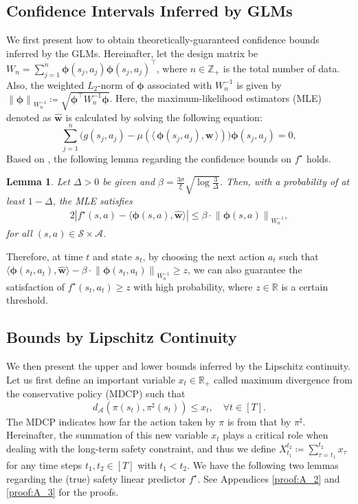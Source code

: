 \documentclass[letterpaper]{article} %
\newtheorem{lemma}
{Lemma}
\newcommand{\la}{\langle\,}
\newcommand{\ra}{\,\rangle}
\newcommand{\R}{\mathbb{R}}
\newcommand{\cA}{\mathcal{A}}
\newcommand{\cS}{\mathcal{S}}
\newcommand{\bphi}{\bm{\phi}}
\newcommand{\iprod}[2]{\langle #1, #2 \rangle}
\newcommand{\abs}[1]{\left|{#1}\right|}
\newcommand{\onlynorm}[1]{\left\|{#1}\right\|}
\begin{document}
\subsection{Confidence Intervals Inferred by GLMs}
\label{sec:bound_glm}

We first present how to obtain theoretically-guaranteed confidence bounds inferred by the GLMs.
Hereinafter, let the design matrix be
%
$W_n = \sum_{j=1}^n \bm{\phi}(s_j, a_j) \bm{\phi}(s_j, a_j)^\top$, where $n \in \mathbb{Z}_+$ is the total number of data.
%
Also, the weighted $L_2$-norm of $\bm{\phi}$ associated with $W_n^{-1}$ is given by
$\onlynorm{\bm{\phi}}_{W_n^{-1}} \coloneqq \sqrt{\bm{\phi}^\top W_n^{-1} \bm{\phi}}$.
%
Here, the maximum-likelihood estimators (MLE) denoted as $\hat{\bm{w}}$ is calculated by solving the following equation:
%
\begin{equation*}
    \sum_{j=1}^n \bigl(g(s_j, a_j) - \mu(\la \bphi(s_j, a_j), \bm{w} \ra) \bigr) \bphi(s_j, a_j) = 0,
\end{equation*}
%
Based on \citet{li2017provably}, the following lemma regarding the confidence bounds on $f^\star$ holds.
%
\begin{lemma}
\label{lemma:confidence_bound}
Let $\Delta > 0$ be given and $\beta = \frac{3 \sigma}{\xi} \sqrt{\log \frac{3}{\Delta}}$.
%
Then, with a probability of at least $1-\Delta$, the MLE satisfies
%
\begin{alignat*}{2}
\abs{f^\star(s,a) - \iprod{\bphi(s,a)}{\hat{\bm{w}}}} \le \beta \cdot \onlynorm{\bphi(s,a)}_{W_n^{-1}},
\end{alignat*}
%
for all $(s,a) \in \cS \times \cA$.
\end{lemma}
%
\noindent
Therefore, at time $t$ and state $s_t$, by choosing the next action $a_t$ such that $\iprod{\bphi(s_t, a_t)}{\hat{\bm{w}}} - \beta \cdot \onlynorm{\bphi(s_t, a_t)}_{W_n^{-1}} \ge z$, we can also guarantee the satisfaction of $f^\star(s_t, a_t) \ge z$ with high probability, where $z \in \R$ is a certain threshold.

\subsection{Bounds by Lipschitz Continuity}
\label{sec:bound_lipschiz}

We then present the upper and lower bounds inferred by the Lipschitz continuity.
Let us first define an important variable $x_t \in \R_+$ called maximum divergence from the conservative policy (MDCP) such that
%
\begin{equation}
    \label{eq:policy_x_t}
    d_\cA(\pi(s_t), \pi^\sharp(s_t)) \le x_t, \quad \forall t \in [T].
\end{equation}
%
The MDCP indicates how far the action taken by $\pi$ is from that by $\pi^\sharp$.
Hereinafter, the summation of this new variable $x_t$ plays a critical role when dealing with the long-term safety constraint, and thus we define $X_{t_1}^{t_2} \coloneqq \sum_{\tau=t_1}^{t_2} x_\tau$ for any time steps $t_1, t_2 \in [T]$ with $t_1 < t_2$.
%
We have the following two lemmas regarding the (true) safety linear predictor $f^\star$.
See Appendices \ref{proof:A_2} and \ref{proof:A_3} for the proofs.
\end{document}
